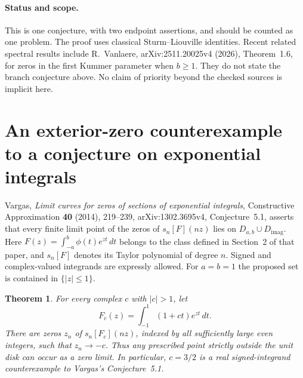 \documentclass[11pt,a4paper]{article}
\newtheorem{theorem}{Theorem}[section]
\theoremstyle{definition}
\theoremstyle{remark}
\numberwithin{equation}{section}
\begin{document}
\paragraph{Status and scope.}
This is one conjecture, with two endpoint assertions, and should be
counted as one problem. The proof uses classical Sturm--Liouville
identities. Recent related spectral results include R.~Vanlaere,
arXiv:2511.20025v4 (2026), Theorem~1.6, for zeros in the first Kummer
parameter when $b\geq1$. They do not state the branch conjecture above.
No claim of priority beyond the checked sources is implicit here.


\section{An exterior-zero counterexample to a conjecture on exponential integrals}
\label{p2:sec:vargas-counterexample}

Vargas, \emph{Limit curves for zeros of sections of exponential
integrals}, Constructive Approximation \textbf{40} (2014), 219--239,
arXiv:1302.3695v4, Conjecture~5.1, asserts that every finite limit point
of the zeros of $s_n[F](nz)$ lies on $D_{a,b}\cup D_{\mathrm{imag}}$.
Here $F(z)=\int_{-a}^b\phi(t)e^{zt}\,dt$ belongs to the class defined in
Section~2 of that paper, and $s_n[F]$ denotes its Taylor polynomial of
degree $n$. Signed and complex-valued integrands are expressly allowed.
For $a=b=1$ the proposed set is contained in $\{|z|\leq1\}$.

\begin{theorem}\label{p2:thm:vargas-counterexample}
For every complex $c$ with $|c|>1$, let
\[
 F_c(z)=\int_{-1}^1(1+ct)e^{zt}\,dt.
\]
There are zeros $z_n$ of $s_n[F_c](nz)$, indexed by all sufficiently
large even integers, such that $z_n\to-c$. Thus any prescribed point
strictly outside the unit disk can occur as a zero limit. In particular,
$c=3/2$ is a real signed-integrand counterexample to Vargas's Conjecture~5.1.
\end{theorem}
\end{document}
